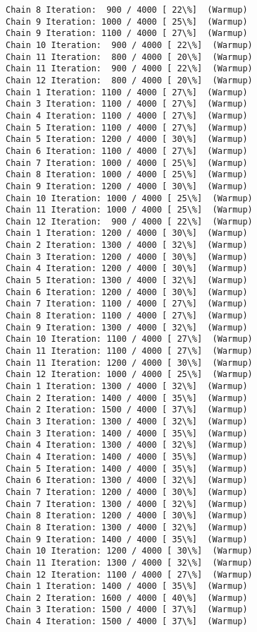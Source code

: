 \documentclass[11pt]{article}
\begin{document}
\begin{Verbatim}[commandchars=\\\{\}]
Chain 8 Iteration:  900 / 4000 [ 22\%]  (Warmup)
Chain 9 Iteration: 1000 / 4000 [ 25\%]  (Warmup)
Chain 9 Iteration: 1100 / 4000 [ 27\%]  (Warmup)
Chain 10 Iteration:  900 / 4000 [ 22\%]  (Warmup)
Chain 11 Iteration:  800 / 4000 [ 20\%]  (Warmup)
Chain 11 Iteration:  900 / 4000 [ 22\%]  (Warmup)
Chain 12 Iteration:  800 / 4000 [ 20\%]  (Warmup)
Chain 1 Iteration: 1100 / 4000 [ 27\%]  (Warmup)
Chain 3 Iteration: 1100 / 4000 [ 27\%]  (Warmup)
Chain 4 Iteration: 1100 / 4000 [ 27\%]  (Warmup)
Chain 5 Iteration: 1100 / 4000 [ 27\%]  (Warmup)
Chain 5 Iteration: 1200 / 4000 [ 30\%]  (Warmup)
Chain 6 Iteration: 1100 / 4000 [ 27\%]  (Warmup)
Chain 7 Iteration: 1000 / 4000 [ 25\%]  (Warmup)
Chain 8 Iteration: 1000 / 4000 [ 25\%]  (Warmup)
Chain 9 Iteration: 1200 / 4000 [ 30\%]  (Warmup)
Chain 10 Iteration: 1000 / 4000 [ 25\%]  (Warmup)
Chain 11 Iteration: 1000 / 4000 [ 25\%]  (Warmup)
Chain 12 Iteration:  900 / 4000 [ 22\%]  (Warmup)
Chain 1 Iteration: 1200 / 4000 [ 30\%]  (Warmup)
Chain 2 Iteration: 1300 / 4000 [ 32\%]  (Warmup)
Chain 3 Iteration: 1200 / 4000 [ 30\%]  (Warmup)
Chain 4 Iteration: 1200 / 4000 [ 30\%]  (Warmup)
Chain 5 Iteration: 1300 / 4000 [ 32\%]  (Warmup)
Chain 6 Iteration: 1200 / 4000 [ 30\%]  (Warmup)
Chain 7 Iteration: 1100 / 4000 [ 27\%]  (Warmup)
Chain 8 Iteration: 1100 / 4000 [ 27\%]  (Warmup)
Chain 9 Iteration: 1300 / 4000 [ 32\%]  (Warmup)
Chain 10 Iteration: 1100 / 4000 [ 27\%]  (Warmup)
Chain 11 Iteration: 1100 / 4000 [ 27\%]  (Warmup)
Chain 11 Iteration: 1200 / 4000 [ 30\%]  (Warmup)
Chain 12 Iteration: 1000 / 4000 [ 25\%]  (Warmup)
Chain 1 Iteration: 1300 / 4000 [ 32\%]  (Warmup)
Chain 2 Iteration: 1400 / 4000 [ 35\%]  (Warmup)
Chain 2 Iteration: 1500 / 4000 [ 37\%]  (Warmup)
Chain 3 Iteration: 1300 / 4000 [ 32\%]  (Warmup)
Chain 3 Iteration: 1400 / 4000 [ 35\%]  (Warmup)
Chain 4 Iteration: 1300 / 4000 [ 32\%]  (Warmup)
Chain 4 Iteration: 1400 / 4000 [ 35\%]  (Warmup)
Chain 5 Iteration: 1400 / 4000 [ 35\%]  (Warmup)
Chain 6 Iteration: 1300 / 4000 [ 32\%]  (Warmup)
Chain 7 Iteration: 1200 / 4000 [ 30\%]  (Warmup)
Chain 7 Iteration: 1300 / 4000 [ 32\%]  (Warmup)
Chain 8 Iteration: 1200 / 4000 [ 30\%]  (Warmup)
Chain 8 Iteration: 1300 / 4000 [ 32\%]  (Warmup)
Chain 9 Iteration: 1400 / 4000 [ 35\%]  (Warmup)
Chain 10 Iteration: 1200 / 4000 [ 30\%]  (Warmup)
Chain 11 Iteration: 1300 / 4000 [ 32\%]  (Warmup)
Chain 12 Iteration: 1100 / 4000 [ 27\%]  (Warmup)
Chain 1 Iteration: 1400 / 4000 [ 35\%]  (Warmup)
Chain 2 Iteration: 1600 / 4000 [ 40\%]  (Warmup)
Chain 3 Iteration: 1500 / 4000 [ 37\%]  (Warmup)
Chain 4 Iteration: 1500 / 4000 [ 37\%]  (Warmup)

\end{Verbatim}
\end{document}
